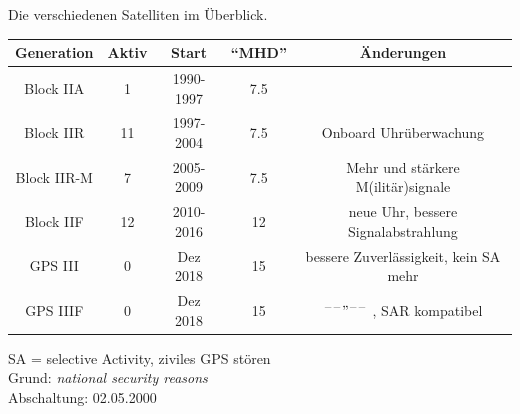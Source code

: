 \begin{frame}{Die verschiedenen Satelliten im Überblick.}
    \begin{table}
        \begin{tabular}{c S[table-format=2.0] c S[table-format=2.1] c}
            \toprule
            {Generation} & {Aktiv} & {Start} & {\enquote{MHD}} & {Änderungen} \\
            \midrule
            Block IIA   &  1 & 1990-1997 & 7.5 & \\
            Block IIR   & 11 & 1997-2004 & 7.5 & Onboard Uhrüberwachung \\
            Block IIR-M &  7 & 2005-2009 & 7.5 & Mehr und stärkere M(ilitär)signale \\
            Block IIF   & 12 & 2010-2016 & 12  & neue Uhr, bessere Signalabstrahlung \\
            GPS III     &  0 & Dez 2018  & 15  & bessere Zuverlässigkeit, kein SA mehr \\
            GPS IIIF    &  0 & Dez 2018  & 15  & $^{\---}"^{\---}$ , SAR kompatibel \\
            \bottomrule
        \end{tabular}
    \end{table}
    SA = selective Activity, ziviles GPS stören\\
    Grund: \textit{national security reasons}\\
    Abschaltung: 02.05.2000
\end{frame}

